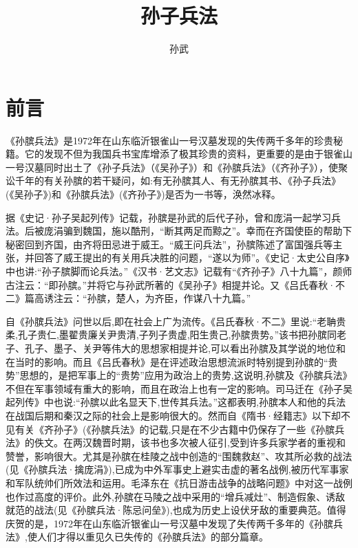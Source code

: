 \documentclass[12pt,UTF8]{ctexbook}
\title{\heiti\zihao{0} 孙子兵法}
\author{孙武}
\date{}
\begin{document}
	
\maketitle
\tableofcontents

\frontmatter
\chapter{前言}

《孙膑兵法》是1972年在山东临沂银雀山一号汉墓发现的失传两千多年的珍贵秘籍。它的发现不但为我国兵书宝库增添了极其珍贵的资料，更重要的是由于银雀山一号汉墓同时出土了《孙子兵法》（《吴孙子》）和《孙膑兵法》（《齐孙子》），使聚讼千年的有关孙膑的若干疑问，如:有无孙膑其人、有无孙膑其书、《孙子兵法》(《吴孙子》)和《孙膑兵法》(《齐孙子》)是否为一书等，涣然冰释。

据《史记·孙子吴起列传》记载，孙膑是孙武的后代子孙，曾和庞涓一起学习兵法。后被庞涓骗到魏国，施以酷刑，“断其两足而黥之”。幸而在齐国使臣的帮助下秘密回到齐国，由齐将田忌进于威王。“威王问兵法”，孙膑陈述了富国强兵等主张，并回答了威王提出的有关用兵决胜的问题，“遂以为师”。《史记·太史公自序》中也讲:“孙子膑脚而论兵法。”《汉书·艺文志》记载有“《齐孙子》八十九篇”，颜师古注云：“即孙膑。”并将它与孙武所著的《吴孙子》相提并论。又《吕氏春秋·不二》篇高诱注云：“孙膑，楚人，为齐臣，作谋八十九篇。”

自《孙膑兵法》问世以后,即在社会上广为流传。《吕氏春秋·不二》里说:“老聃贵柔,孔子贵仁,墨翟贵廉关尹贵清,子列子贵虚,阳生贵己,孙膑贵势。”该书把孙膑同老子、孔子、墨子、关尹等伟大的思想家相提并论,可以看出孙膑及其学说的地位和在当时的影响。而且《吕氏春秋》是在评述政治思想流派时特别提到孙膑的“贵势”思想的，是把军事上的“贵势”应用为政治上的贵势,这说明,孙膑及《孙膑兵法》不但在军事领域有重大的影响，而且在政治上也有一定的影响。司马迁在《孙子吴起列传》中也说:“孙膑以此名显天下,世传其兵法。”这都表明,孙膑本人和他的兵法在战国后期和秦汉之际的社会上是影响很大的。然而自《隋书·经籍志》以下却不见有关《齐孙子》(《孙膑兵法》的记载,只是在不少古籍中仍保存了一些《孙膑兵法》的佚文。在两汉魏晋时期，该书也多次被人征引,受到许多兵家学者的重视和赞誉，影响很大。尤其是孙膑在桂陵之战中创造的“围魏救赵”、攻其所必救的战法(见《孙膑兵法·擒庞涓》),已成为中外军事史上避实击虚的著名战例,被历代军事家和军队统帅们所效法和运用。毛泽东在《抗日游击战争的战略问题》中对这一战例也作过高度的评价。此外,孙膑在马陵之战中采用的“增兵减灶”、制造假象、诱敌就范的战法(见《孙膑兵法·陈忌问垒》),也成为历史上设伏牙敌的重要典范。值得庆贺的是，1972年在山东临沂银雀山一号汉墓中发现了失传两千多年的《孙膑兵法》,使人们才得以重见久已失传的《孙膑兵法》的部分篇章。
\end{document}

